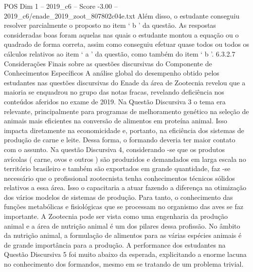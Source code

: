 \begin{textsample}{POS Dim 1 – 2019\_c6 – Score -3.00 – 2019\_c6/enade\_2019\_zoot\_807802c04e.txt}
Além disso, o estudante conseguiu resolver parcialmente o proposto no item ‘ b ’ da questão.
As respostas consideradas boas foram aquelas nas quais o estudante montou a equação ou o quadrado de forma correta, assim como conseguiu efetuar quase todos ou todos os cálculos relativos ao item ‘ a ’ da questão, como também do item ‘ b ’. 6.3.2.7 Considerações Finais sobre as questões discursivas do Componente de Conhecimentos Específicos A análise global do desempenho obtido pelos estudantes nas questões discursivas do Enade da área de Zootecnia revelou que a maioria se enquadrou no grupo das notas fracas, revelando deficiência nos conteúdos aferidos no exame de 2019.
Na Questão Discursiva 3 o tema era relevante, principalmente para programas de melhoramento genético na seleção de animais mais eficientes na conversão de alimentos em proteína animal.
Isso impacta diretamente na economicidade e, portanto, na eficiência dos sistemas de produção de carne e leite.
Dessa forma, o formando deveria ter maior contato com o assunto.
Na questão Discursiva 4, considerando -se que os produtos avícolas ( carne, ovos e outros ) são produzidos e demandados em larga escala no território brasileiro e também são exportados em grande quantidade, faz -se necessário que o profissional zootecnista tenha conhecimentos técnicos sólidos relativos a essa área.
Isso o capacitaria a atuar fazendo a diferença na otimização dos vários modelos de sistemas de produção.
Para tanto, o conhecimento das funções metabólicas e fisiológicas que se processam no organismo das aves se faz importante.
A Zootecnia pode ser vista como uma engenharia da produção animal e a área de nutrição animal é um dos pilares dessa profissão.
No âmbito da nutrição animal, a formulação de alimentos para as várias espécies animais é de grande importância para a produção.
A performance dos estudantes na Questão Discursiva 5 foi muito abaixo da esperada, explicitando a enorme lacuna no conhecimento dos formandos, mesmo em se tratando de um problema trivial.

\end{textsample}

